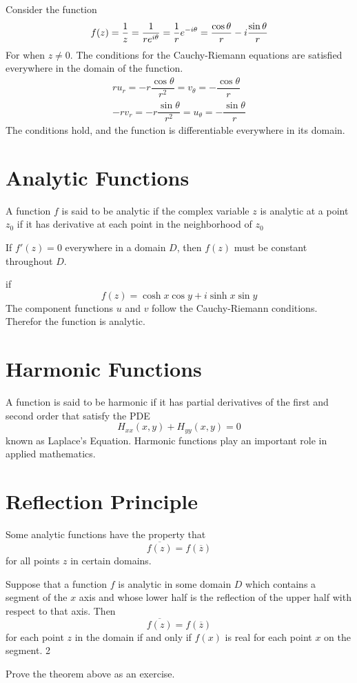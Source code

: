 \begin{example}
	Consider the function \[ f(z) = \dfrac{1}{z} = \dfrac{1}{r e^{i \theta}} = \dfrac{1}{r}e^{-i\theta} = \dfrac{\cos \theta}{r} - i\dfrac{\sin \theta }{r} \] For when $ z \neq 0 $. The conditions for the Cauchy-Riemann equations are satisfied everywhere in the domain of the function. 
	\begin{gather}
	ru_r = -r\dfrac{\cos \theta}{r^2} = v_\theta = -\dfrac{\cos \theta}{r} \\
	-rv_r = -r \dfrac{\sin \theta }{r^2} = u_\theta = -\dfrac{\sin \theta}{r}
	\end{gather}
	The conditions hold, and the function is differentiable everywhere in its domain. 
\end{example}
\section{Analytic Functions}
A function $ f $ is said to be analytic if the complex variable $ z $ is analytic at a point $ z_0 $ if it has derivative at each point in the neighborhood of $ z_0 $ 
\begin{theorem}
	If $ f'(z)  =0$ everywhere in a domain $ D $, then $ f(z) $ must be constant throughout $ D $. 
\end{theorem}
\begin{example}
	if \[ f(z) = \cosh x \cos y + i \sinh x \sin y \]
	The component functions $ u $ and $ v $ follow the Cauchy-Riemann conditions. Therefor the function is analytic. 
\end{example}
\section{Harmonic Functions}
A function is said to be harmonic if it has partial derivatives of the first and second order that satisfy the PDE 
\[ H_{xx}(x,y) + H_{yy}(x,y) = 0 \] known as Laplace's Equation. Harmonic functions play an important role in applied mathematics. 
\section{Reflection Principle}
Some analytic functions have the property that \[ \overline{f(z)} = f(\overline{z}) \] for all points $ z $ in certain domains. 
\begin{theorem}
	Suppose that a function $ f $ is analytic in some domain $ D $ which contains a segment of the $ x $ axis and whose lower half is the reflection of the upper half with respect to that axis. Then \[ \overline{f(z)} = f(\overline{z}) \] for each point $ z $ in the domain if and only if $ f(x) $ is real for each point $ x $ on the segment. 2
\end{theorem}
Prove the theorem above as an exercise. 

















